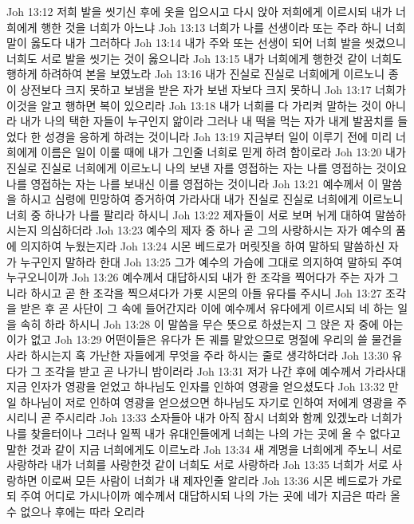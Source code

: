 Joh 13:12  저희 발을 씻기신 후에 옷을 입으시고 다시 앉아 저희에게 이르시되 내가 너희에게 행한 것을 너희가 아느냐
Joh 13:13  너희가 나를 선생이라 또는 주라 하니 너희 말이 옳도다 내가 그러하다
Joh 13:14  내가 주와 또는 선생이 되어 너희 발을 씻겼으니 너희도 서로 발을 씻기는 것이 옳으니라
Joh 13:15  내가 너희에게 행한것 같이 너희도 행하게 하려하여 본을 보였노라
Joh 13:16  내가 진실로 진실로 너희에게 이르노니 종이 상전보다 크지 못하고 보냄을 받은 자가 보낸 자보다 크지 못하니
Joh 13:17  너희가 이것을 알고 행하면 복이 있으리라
Joh 13:18  내가 너희를 다 가리켜 말하는 것이 아니라 내가 나의 택한 자들이 누구인지 앎이라 그러나 내 떡을 먹는 자가 내게 발꿈치를 들었다 한 성경을 응하게 하려는 것이니라
Joh 13:19  지금부터 일이 이루기 전에 미리 너희에게 이름은 일이 이룰 때에 내가 그인줄 너희로 믿게 하려 함이로라
Joh 13:20  내가 진실로 진실로 너희에게 이르노니 나의 보낸 자를 영접하는 자는 나를 영접하는 것이요 나를 영접하는 자는 나를 보내신 이를 영접하는 것이니라
Joh 13:21  예수께서 이 말씀을 하시고 심령에 민망하여 증거하여 가라사대 내가 진실로 진실로 너희에게 이르노니 너희 중 하나가 나를 팔리라 하시니
Joh 13:22  제자들이 서로 보며 뉘게 대하여 말씀하시는지 의심하더라
Joh 13:23  예수의 제자 중 하나 곧 그의 사랑하시는 자가 예수의 품에 의지하여 누웠는지라
Joh 13:24  시몬 베드로가 머릿짓을 하여 말하되 말씀하신 자가 누구인지 말하라 한대
Joh 13:25  그가 예수의 가슴에 그대로 의지하여 말하되 주여 누구오니이까
Joh 13:26  예수께서 대답하시되 내가 한 조각을 찍어다가 주는 자가 그니라 하시고 곧 한 조각을 찍으셔다가 가룟 시몬의 아들 유다를 주시니
Joh 13:27  조각을 받은 후 곧 사단이 그 속에 들어간지라 이에 예수께서 유다에게 이르시되 네 하는 일을 속히 하라 하시니
Joh 13:28  이 말씀을 무슨 뜻으로 하셨는지 그 앉은 자 중에 아는 이가 없고
Joh 13:29  어떤이들은 유다가 돈 궤를 맡았으므로 명절에 우리의 쓸 물건을 사라 하시는지 혹 가난한 자들에게 무엇을 주라 하시는 줄로 생각하더라
Joh 13:30  유다가 그 조각을 받고 곧 나가니 밤이러라
Joh 13:31  저가 나간 후에 예수께서 가라사대 지금 인자가 영광을 얻었고 하나님도 인자를 인하여 영광을 얻으셨도다
Joh 13:32  만일 하나님이 저로 인하여 영광을 얻으셨으면 하나님도 자기로 인하여 저에게 영광을 주시리니 곧 주시리라
Joh 13:33  소자들아 내가 아직 잠시 너희와 함께 있겠노라 너희가 나를 찾을터이나 그러나 일찍 내가 유대인들에게 너희는 나의 가는 곳에 올 수 없다고 말한 것과 같이 지금 너희에게도 이르노라
Joh 13:34  새 계명을 너희에게 주노니 서로 사랑하라 내가 너희를 사랑한것 같이 너희도 서로 사랑하라
Joh 13:35  너희가 서로 사랑하면 이로써 모든 사람이 너희가 내 제자인줄 알리라
Joh 13:36  시몬 베드로가 가로되 주여 어디로 가시나이까 예수께서 대답하시되 나의 가는 곳에 네가 지금은 따라 올 수 없으나 후에는 따라 오리라
